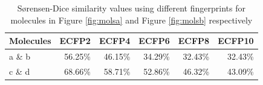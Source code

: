 \begin{table}[h]
	\centering
	\begin{tabularx}{0.69\textwidth}{l
			r
			r 
			r
			r
			r
		}
		\toprule
		
		\bf{Molecules}  &  \multicolumn{1}{c}{\bf{ECFP2}}   & \multicolumn{1}{c}{\bf{ECFP4}}&  \multicolumn{1}{c}{\bf{ECFP6}} & \multicolumn{1}{c}{\bf{ECFP8}} &\multicolumn{1}{c}{\bf{ECFP10}} \\
		\midrule
		a \& b   & 56.25\%   &  46.15\%  & 34.29\%   & 32.43\% & 32.43\%  \\
		
		c \& d   & 68.66\%  &  58.71\% &  52.86\%   & 46.32\% & 43.09\%  \\
		
		
		\bottomrule
	\end{tabularx} 
	
	
	\caption{Sørensen-Dice similarity values \citep{sorensen1948method, dice1945measures} using different fingerprints for molecules in Figure \ref{fig:molsa} and Figure \ref{fig:molsb} respectively}
	\label{tab:dis_metric_2Dshapes}
\end{table}

